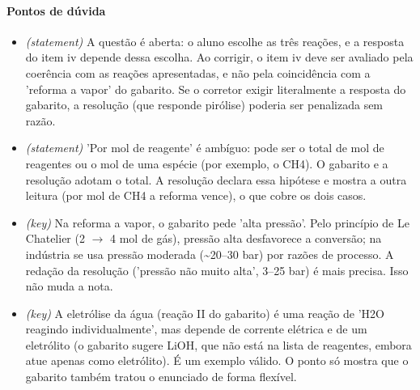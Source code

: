 \documentclass{article}%
\begin{document}
\paragraph{Pontos de dúvida}%
\begin{itemize}%
\item%
\textit{(statement)} A questão é aberta: o aluno escolhe as três reações, e a resposta do item iv depende dessa escolha. Ao corrigir, o item iv deve ser avaliado pela coerência com as reações apresentadas, e não pela coincidência com a 'reforma a vapor' do gabarito. Se o corretor exigir literalmente a resposta do gabarito, a resolução (que responde pirólise) poderia ser penalizada sem razão.%
\item%
\textit{(statement)} 'Por mol de reagente' é ambíguo: pode ser o total de mol de reagentes ou o mol de uma espécie (por exemplo, o CH4). O gabarito e a resolução adotam o total. A resolução declara essa hipótese e mostra a outra leitura (por mol de CH4 a reforma vence), o que cobre os dois casos.%
\item%
\textit{(key)} Na reforma a vapor, o gabarito pede 'alta pressão'. Pelo princípio de Le Chatelier (2 $\to$ 4 mol de gás), pressão alta desfavorece a conversão; na indústria se usa pressão moderada (\textasciitilde{}20--30 bar) por razões de processo. A redação da resolução ('pressão não muito alta', 3--25 bar) é mais precisa. Isso não muda a nota.%
\item%
\textit{(key)} A eletrólise da água (reação II do gabarito) é uma reação de 'H2O reagindo individualmente', mas depende de corrente elétrica e de um eletrólito (o gabarito sugere LiOH, que não está na lista de reagentes, embora atue apenas como eletrólito). É um exemplo válido. O ponto só mostra que o gabarito também tratou o enunciado de forma flexível.%
\end{itemize}%
\end{document}

